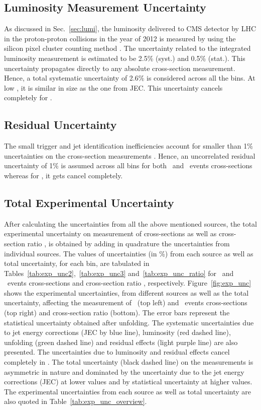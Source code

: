 \subsection{Luminosity Measurement Uncertainty}
As discussed in Sec.~\ref{sec:lumi}, the luminosity delivered to CMS detector by LHC in the proton-proton collisions in the year of 2012 is measured by using the silicon pixel cluster counting method \cite{CMS:2013gfa}. The uncertainty related to the integrated luminosity measurement is estimated to be 2.5\% (syst.) and 0.5\% (stat.). This uncertainty propagates directly to any absolute cross-section measurement. Hence, a total systematic uncertainty of 2.6\% is considered across all the \httwo bins. At low \httwons, it is similar in size as the one from JEC. This uncertainty cancels completely for \ratio.

\subsection{Residual Uncertainty}
The small trigger and jet identification inefficiencies account for smaller than 1\% uncertainties on the cross-section measurements \cite{Chatrchyan:2012bja,Khachatryan:2016mlc}. Hence, an uncorrelated residual uncertainty of 1\% is assumed across all \httwo bins for both \njt~and \njth~events cross-sections whereas for \rations, it gets cancel completely.

\subsection{Total Experimental Uncertainty}
After calculating the uncertainties from all the above mentioned sources, the total experimental uncertainty on measurement of cross-sections as well as cross-section ratio \rations, is obtained by adding in quadrature the uncertainties from individual sources. The values of uncertainties (in \%) from each source as well as total uncertainty, for each \httwo bin, are tabulated in Tables~\ref{tab:exp_unc2},~\ref{tab:exp_unc3} and~\ref{tab:exp_unc_ratio} for \njt~and \njth~events cross-sections and cross-section ratio \rations, respectively. Figure~\ref{fig:exp_unc} shows the experimental uncertainties, from different sources as well as the total uncertainty, affecting the measurement of \njt~(top left) and \njth~events cross-sections (top right) and cross-section ratio \ratio (bottom). The error bars represent the statistical uncertainty obtained after unfolding. The systematic uncertainties due to jet energy corrections (JEC by blue line), luminosity (red dashed line), unfolding (green dashed line) and residual effects (light purple line) are also presented. The uncertainties due to luminosity and residual effects cancel completely in \ratio. The total uncertainty (black dashed line) on the measurements is asymmetric in nature and dominated by the uncertainty due to the jet energy corrections (JEC) at lower \httwo values and by statistical uncertainty at higher \httwo values. The experimental uncertainties from each source as well as total uncertainty are also quoted in Table~\ref{tab:exp_unc_overview}. 

